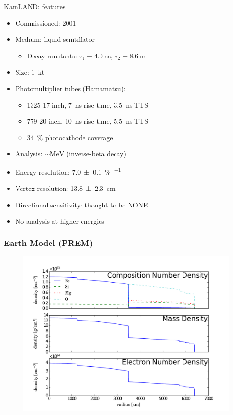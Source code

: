 \documentclass[14pt]{beamer}
\begin{document}
\begin{frame}[t]{KamLAND: features}
	\begin{itemize}
		\item Commissioned: \num{2001}
		\item Medium: liquid scintillator
			\begin{itemize}
				\item Decay constants: $\tau_1 = \SI{4.0}{\nano\second}$, $\tau_2 = \SI{8.6}{\nano\second}$
			\end{itemize}
		\item Size: \SI{1}{\kilo\tonne}
		\item Photomultiplier tubes (Hamamatsu):\\
			\begin{itemize}
				\item \num{1325} 17-inch, \SI{7}{\nano\second} rise-time,
					\SI{3.5}{\nano\second} TTS
				\item \num{779} 20-inch, \SI{10}{\nano\second} rise-time,
					\SI{5.5}{\nano\second} TTS
				\item \SI{34}{\percent} photocathode coverage
			\end{itemize}
		\item Analysis: $\sim\!\si{\mega\electronvolt}$ \APnue
			(inverse-beta decay)
		\item Energy resolution:
			\SI{7.0\pm0.1}{\percent\per{}}
		\item Vertex resolution:
			\SI{13.8\pm2.3}{\centi\meter}
		\item {\color{red}Directional sensitivity: thought to be NONE}
		\item {\color{red}No analysis at higher energies}
	\end{itemize}
\end{frame}

\begin{frame}
	\frametitle{Earth Model (PREM)}
	\begin{figure}
		\centering
		\includegraphics[width=0.95\linewidth]{earth_density.pdf}
	\end{figure}
\end{frame}
\end{document}
